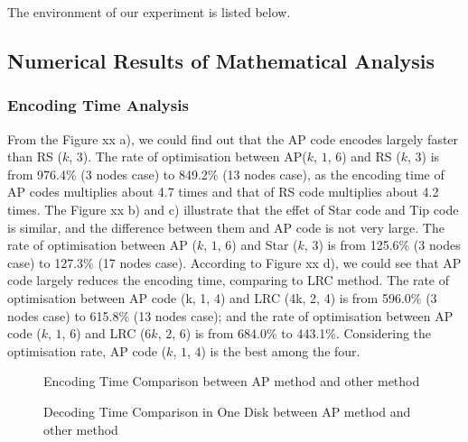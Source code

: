 \documentclass[sigconf]{acmart}
\begin{document}
The environment of our experiment is listed below.


\subsection{Numerical Results of Mathematical Analysis}
\subsubsection{Encoding Time Analysis}
From the Figure xx a), we could find out that the AP code encodes largely faster than RS ($k$, $3$). The rate of optimisation between AP($k$, $1$, $6$) and RS ($k$, $3$) is from 976.4\% (3 nodes case) to 849.2\% (13 nodes case), as the encoding time of AP codes multiplies about 4.7 times and that of RS code multiplies about 4.2 times. The Figure xx b) and c) illustrate that the effet of Star code and Tip code is similar, and the difference between them and AP code is not very large. The rate of optimisation between AP ($k$, $1$, $6$) and Star ($k$, $3$) is from 125.6\% (3 nodes case) to 127.3\% (17 nodes case). According to Figure xx d), we could see that AP code largely reduces the encoding time, comparing to LRC method. The rate of optimisation between AP code (k, 1, 4) and LRC (4k, 2, 4) is from 596.0\% (3 nodes case) to 615.8\% (13 nodes case); and the rate of optimisation between AP code ($k$, $1$, $6$) and LRC ($6k$, $2$, $6$) is from 684.0\% to 443.1\%. Considering the optimisation rate, AP code ($k$, $1$, $4$) is the best among the four.\par



\begin{figure*}[]
\caption{Encoding Time Comparison between AP method and other method}\label{fig-encoding}
\end{figure*}


\begin{figure*}[]
\caption{Decoding Time Comparison in One Disk between AP method and other method}\label{fig-decoding-1}
\end{figure*}
\end{document}
